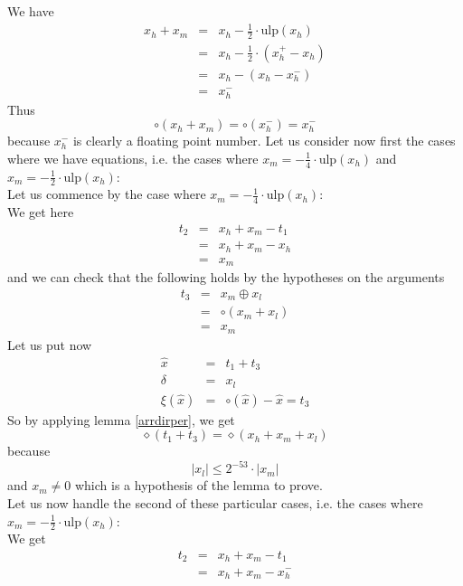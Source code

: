 \documentclass[a4paper,10pt,twoside]{article}
\newenvironment{proof}[1][Proof]{\begin{trivlist}
\item[\hskip \labelsep {\bfseries #1}]}{\end{trivlist}}
\newcommand{\hi}{\ensuremath{\mathit{h}}}
\newcommand{\mi}{\ensuremath{\mathit{m}}}
\newcommand{\lo}{\ensuremath{\mathit{l}}}
\newcommand{\mUlp}{\ensuremath{\mathrm{ulp}}}
\begin{document}
\begin{proof}
We have 
\begin{eqnarray*}
x_\hi + x_\mi & = & x_\hi - \frac{1}{2} \cdot \mUlp\left( x_\hi \right) \\
& = & x_\hi - \frac{1}{2} \cdot \left( x_\hi^+ - x_\hi \right) \\
& = & x_\hi - \left( x_\hi - x_\hi^- \right) \\
& = & x_\hi^- 
\end{eqnarray*}
Thus $$\circ \left( x_\hi + x_\mi \right) = \circ \left( x_\hi^- \right) = x_\hi^-$$
because $x_\hi^-$ is clearly a floating point number.
Let us consider now first the cases where we have equations, i.e. the cases where 
$x_\mi = -\frac{1}{4} \cdot \mUlp\left( x_\hi \right)$ and
$x_\mi = - \frac{1}{2} \cdot \mUlp\left( x_\hi \right)$: \\
Let us commence by the case where $x_\mi = -\frac{1}{4} \cdot \mUlp\left( x_\hi \right)$: \\
We get here
\begin{eqnarray*}
t_2 & = & x_\hi + x_\mi - t_1 \\
& = & x_\hi + x_\mi - x_\hi \\
& = & x_\mi 
\end{eqnarray*}
and we can check that the following holds by the hypotheses on the arguments
\begin{eqnarray*}
t_3 & = & x_\mi \oplus x_\lo \\
& = & \circ \left( x_\mi + x_\lo \right) \\
& = & x_\mi 
\end{eqnarray*}
Let us put now
\begin{eqnarray*}
\hat{x} & = & t_1 + t_3 \\
\delta & = & x_\lo \\
\xi\left( \hat{x} \right) & = & \circ\left( \hat{x} \right) - \hat{x} = t_3
\end{eqnarray*}
So by applying lemma \ref{arrdirper}, we get
$$\diamond \left( t_1 + t_3 \right) = \diamond \left( x_\hi + x_\mi + x_\lo \right)$$
because 
$$\left \vert x_\lo \right \vert \leq 2^{-53} \cdot \left \vert x_\mi \right \vert$$
and $x_\mi \not = 0$ which is a hypothesis of the lemma to prove. \\
Let us now handle the second of these particular cases, i.e. the cases where  
$x_\mi = -\frac{1}{2} \cdot \mUlp\left( x_\hi \right)$: \\
We get
\begin{eqnarray*}
t_2 & = & x_\hi + x_\mi - t_1 \\
& = & x_\hi + x_\mi - x_\hi^- \\

\end{eqnarray*}
\end{proof}
\end{document}
